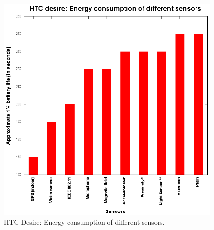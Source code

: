 \begin{figure}[H]
\centering
\includegraphics[scale=1.5]{plots/htc_desire.eps}
\caption{HTC Desire: Energy  consumption of different sensors.}
\end{figure}